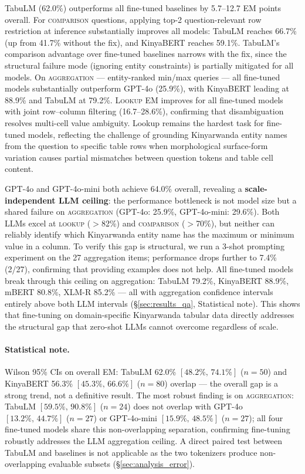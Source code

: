 \documentclass[11pt]{article}
\begin{document}
TabuLM (62.0\%) outperforms all fine-tuned baselines by 5.7--12.7 EM points overall.
For \textsc{comparison} questions, applying top-2 question-relevant row restriction at inference substantially improves all models: TabuLM reaches 66.7\% (up from 41.7\% without the fix), and KinyaBERT reaches 59.1\%.
TabuLM's comparison advantage over fine-tuned baselines narrows with the fix, since the structural failure mode (ignoring entity constraints) is partially mitigated for all models.
On \textsc{aggregation} --- entity-ranked min/max queries --- all fine-tuned models substantially outperform GPT-4o (25.9\%), with KinyaBERT leading at 88.9\% and TabuLM at 79.2\%.
\textsc{Lookup} EM improves for all fine-tuned models with joint row--column filtering (16.7--28.6\%), confirming that disambiguation resolves multi-cell value ambiguity.
Lookup remains the hardest task for fine-tuned models, reflecting the challenge of grounding Kinyarwanda entity names from the question to specific table rows when morphological surface-form variation causes partial mismatches between question tokens and table cell content.

GPT-4o and GPT-4o-mini both achieve 64.0\% overall, revealing a \textbf{scale-independent LLM ceiling}: the performance bottleneck is not model size but a shared failure on \textsc{aggregation} (GPT-4o: 25.9\%, GPT-4o-mini: 29.6\%).
Both LLMs excel at \textsc{lookup} ($>$82\%) and \textsc{comparison} ($>$70\%), but neither can reliably identify which Kinyarwanda entity name has the maximum or minimum value in a column.
To verify this gap is structural, we run a 3-shot prompting experiment on the 27 aggregation items; performance drops further to 7.4\% (2/27), confirming that providing examples does not help.
All fine-tuned models break through this ceiling on aggregation: TabuLM 79.2\%, KinyaBERT 88.9\%, mBERT 80.8\%, XLM-R 85.2\% --- all with aggregation confidence intervals entirely above both LLM intervals (§\ref{sec:results_qa}, Statistical note).
This shows that fine-tuning on domain-specific Kinyarwanda tabular data directly addresses the structural gap that zero-shot LLMs cannot overcome regardless of scale.

\paragraph{Statistical note.}
Wilson 95\% CIs on overall EM: TabuLM 62.0\% $[48.2\%,\,74.1\%]$ ($n{=}50$) and KinyaBERT 56.3\% $[45.3\%,\,66.6\%]$ ($n{=}80$) overlap --- the overall gap is a strong trend, not a definitive result.
The most robust finding is on \textsc{aggregation}: TabuLM $[59.5\%,\,90.8\%]$ ($n{=}24$) does not overlap with GPT-4o $[13.2\%,\,44.7\%]$ ($n{=}27$) or GPT-4o-mini $[15.9\%,\,48.5\%]$ ($n{=}27$); all four fine-tuned models share this non-overlapping separation, confirming fine-tuning robustly addresses the LLM aggregation ceiling.
A direct paired test between TabuLM and baselines is not applicable as the two tokenizers produce non-overlapping evaluable subsets (§\ref{sec:analysis_error}).
\end{document}
